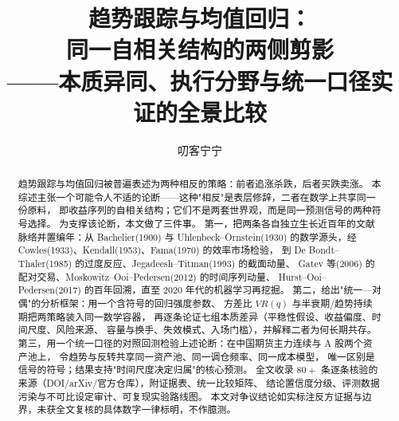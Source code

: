 \documentclass[11pt,a4paper]{ctexart}
\title{\bfseries 趋势跟踪与均值回归：\\
\large 同一自相关结构的两侧剪影\\[2pt]
\large ——本质异同、执行分野与统一口径实证的全景比较}
\author{叨客宁宁}
\date{}
\begin{document}
\maketitle

\begin{abstract}
\noindent 趋势跟踪与均值回归被普遍表述为两种相反的策略：前者追涨杀跌，后者买跌卖涨。
本综述主张一个可能令人不适的论断——这种"相反"是表层修辞，二者在数学上共享同一份原料，
即收益序列的自相关结构；它们不是两套世界观，而是同一预测信号的两种符号选择。
为支撑该论断，本文做了三件事。
第一，把两条各自独立生长近百年的文献脉络并置编年：从 Bachelier(1900) 与
Uhlenbeck--Ornstein(1930) 的数学源头，经 Cowles(1933)、Kendall(1953)、Fama(1970) 的效率市场检验，
到 De Bondt--Thaler(1985) 的过度反应、Jegadeesh--Titman(1993) 的截面动量、
Gatev 等(2006) 的配对交易、Moskowitz--Ooi--Pedersen(2012) 的时间序列动量、
Hurst--Ooi--Pedersen(2017) 的百年回溯，直至 2020 年代的机器学习再挖掘。
第二，给出"统一—对偶"的分析框架：用一个含符号的回归强度参数、
方差比 $VR(q)$ 与半衰期/趋势持续期把两策略装入同一数学容器，
再逐条论证七组本质差异（平稳性假设、收益偏度、时间尺度、风险来源、
容量与换手、失效模式、入场门槛），并解释二者为何长期共存。
第三，用一个统一口径的对照回测检验上述论断：在中国期货主力连续与 A 股两个资产池上，
令趋势与反转共享同一资产池、同一调仓频率、同一成本模型，
唯一区别是信号的符号；结果支持"时间尺度决定归属"的核心预测。
全文收录 $80+$ 条逐条核验的来源（DOI/arXiv/官方仓库），附证据表、统一比较矩阵、
结论置信度分级、评测数据污染与不可比设定审计、可复现实验路线图。
本文对争议结论如实标注反方证据与边界，未获全文复核的具体数字一律标明，不作臆测。
\end{abstract}

\tableofcontents
\newpage
















\end{document}
